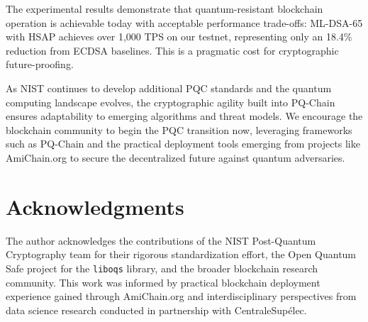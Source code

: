\documentclass[12pt, a4paper, twocolumn]{article}
\begin{document}
The experimental results demonstrate that quantum-resistant blockchain operation is achievable today with acceptable performance trade-offs: ML-DSA-65 with HSAP achieves over 1,000 TPS on our testnet, representing only an 18.4\% reduction from ECDSA baselines. This is a pragmatic cost for cryptographic future-proofing.

As NIST continues to develop additional PQC standards and the quantum computing landscape evolves, the cryptographic agility built into PQ-Chain ensures adaptability to emerging algorithms and threat models. We encourage the blockchain community to begin the PQC transition now, leveraging frameworks such as PQ-Chain and the practical deployment tools emerging from projects like AmiChain.org to secure the decentralized future against quantum adversaries.

\section*{Acknowledgments}

The author acknowledges the contributions of the NIST Post-Quantum Cryptography team for their rigorous standardization effort, the Open Quantum Safe project for the \texttt{liboqs} library, and the broader blockchain research community. This work was informed by practical blockchain deployment experience gained through AmiChain.org and interdisciplinary perspectives from data science research conducted in partnership with CentraleSup\'elec.
\end{document}
